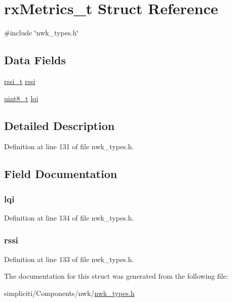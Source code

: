 \hypertarget{structrxMetrics__t}{\section{rx\-Metrics\-\_\-t \-Struct \-Reference}
\label{structrxMetrics__t}
}


{\ttfamily \#include \char`\"{}nwk\-\_\-types.\-h\char`\"{}}

\subsection*{\-Data \-Fields}
\begin{DoxyCompactItemize}
\item 
\hyperlink{nwk__types_8h_a35d5bc216e33176cc91f2bbff3bb66cc}{rssi\-\_\-t} \hyperlink{structrxMetrics__t_a587690cf0776e3ab29f446ea6dc988d4}{rssi}
\item 
\hyperlink{bsp__msp430__defs_8h_aba7bc1797add20fe3efdf37ced1182c5}{uint8\-\_\-t} \hyperlink{structrxMetrics__t_a0dd69605aea6dba42ffd851067dbfe77}{lqi}
\end{DoxyCompactItemize}


\subsection{\-Detailed \-Description}


\-Definition at line 131 of file nwk\-\_\-types.\-h.



\subsection{\-Field \-Documentation}
\hypertarget{structrxMetrics__t_a0dd69605aea6dba42ffd851067dbfe77}{
\subsubsection[{lqi}]{ {\bf lqi}}}\label{structrxMetrics__t_a0dd69605aea6dba42ffd851067dbfe77}


\-Definition at line 134 of file nwk\-\_\-types.\-h.

\hypertarget{structrxMetrics__t_a587690cf0776e3ab29f446ea6dc988d4}{
\subsubsection[{rssi}]{ {\bf rssi}}}\label{structrxMetrics__t_a587690cf0776e3ab29f446ea6dc988d4}


\-Definition at line 133 of file nwk\-\_\-types.\-h.



\-The documentation for this struct was generated from the following file\-:\begin{DoxyCompactItemize}
\item 
simpliciti/\-Components/nwk/\hyperlink{nwk__types_8h}{nwk\-\_\-types.\-h}\end{DoxyCompactItemize}
